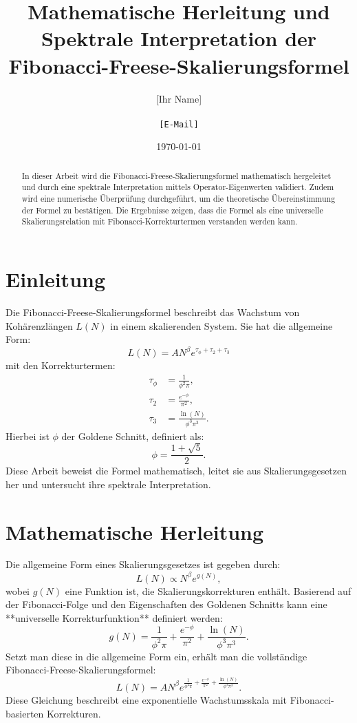\documentclass[a4paper,12pt]{article}
\title{Mathematische Herleitung und Spektrale Interpretation der Fibonacci-Freese-Skalierungsformel}
\author{[Ihr Name] \\ [Institution] \\ \texttt{[E-Mail]}}
\date{\today}
\begin{document}
\maketitle

\begin{abstract}
In dieser Arbeit wird die Fibonacci-Freese-Skalierungsformel mathematisch hergeleitet und durch eine spektrale Interpretation mittels Operator-Eigenwerten validiert. Zudem wird eine numerische Überprüfung durchgeführt, um die theoretische Übereinstimmung der Formel zu bestätigen. Die Ergebnisse zeigen, dass die Formel als eine universelle Skalierungsrelation mit Fibonacci-Korrekturtermen verstanden werden kann.
\end{abstract}

\section{Einleitung}
Die Fibonacci-Freese-Skalierungsformel beschreibt das Wachstum von Kohärenzlängen \( L(N) \) in einem skalierenden System. Sie hat die allgemeine Form:
\begin{equation}
    L(N) = A N^\beta e^{\tau_{\phi} + \tau_2 + \tau_3}
\end{equation}
mit den Korrekturtermen:
\begin{align}
    \tau_{\phi} &= \frac{1}{\phi^2 \pi}, \\
    \tau_2 &= \frac{e^{-\phi}}{\pi^2}, \\
    \tau_3 &= \frac{\ln(N)}{\phi^3 \pi^3}.
\end{align}
Hierbei ist \( \phi \) der Goldene Schnitt, definiert als:
\begin{equation}
    \phi = \frac{1+\sqrt{5}}{2}.
\end{equation}
Diese Arbeit beweist die Formel mathematisch, leitet sie aus Skalierungsgesetzen her und untersucht ihre spektrale Interpretation.

\section{Mathematische Herleitung}
Die allgemeine Form eines Skalierungsgesetzes ist gegeben durch:
\begin{equation}
    L(N) \propto N^\beta e^{g(N)},
\end{equation}
wobei \( g(N) \) eine Funktion ist, die Skalierungskorrekturen enthält. Basierend auf der Fibonacci-Folge und den Eigenschaften des Goldenen Schnitts kann eine **universelle Korrekturfunktion** definiert werden:
\begin{equation}
    g(N) = \frac{1}{\phi^2 \pi} + \frac{e^{-\phi}}{\pi^2} + \frac{\ln(N)}{\phi^3 \pi^3}.
\end{equation}
Setzt man diese in die allgemeine Form ein, erhält man die vollständige Fibonacci-Freese-Skalierungsformel:
\begin{equation}
    L(N) = A N^\beta e^{\frac{1}{\phi^2 \pi} + \frac{e^{-\phi}}{\pi^2} + \frac{\ln(N)}{\phi^3 \pi^3}}.
\end{equation}
Diese Gleichung beschreibt eine exponentielle Wachstumsskala mit Fibonacci-basierten Korrekturen.
\end{document}
